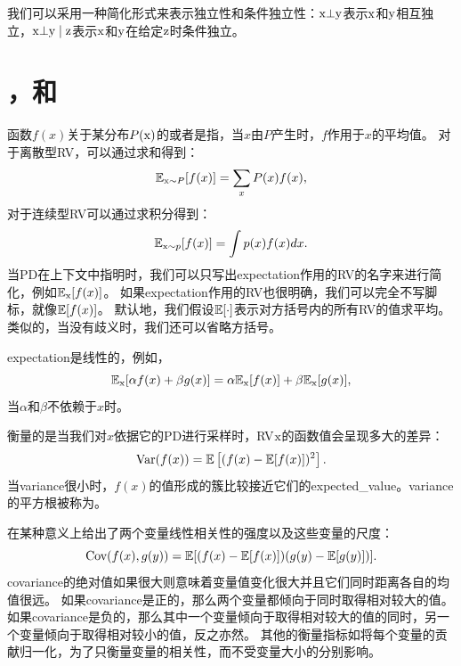 我们可以采用一种简化形式来表示独立性和条件独立性：$\mathrm{x} \bot \mathrm{y}$表示$\mathrm{x}$和$\mathrm{y}$相互独立，$\mathrm{x} \bot \mathrm{y} \mid \mathrm{z}$表示$\mathrm{x}$和$\mathrm{y}$在给定$\mathrm{z}$时条件独立。

\section{，和}
\label{sec:expectation_variance_and_covariance}

函数$f(x)$关于某分布$P(\mathrm{x})$的或者是指，当$x$由$P$产生时，$f$作用于$x$的平均值。
对于离散型\gls{RV}，可以通过求和得到：
\begin{equation}
\mathbb{E}_{\mathrm{x} \sim P}[f(x)] = \sum_x P(x)f(x),
\end{equation}
对于连续型\gls{RV}可以通过求积分得到：
\begin{equation}
\mathbb{E}_{\mathrm{x} \sim p}[f(x)] = \int p(x)f(x)dx.
\end{equation}
当\gls{PD}在上下文中指明时，我们可以只写出\gls{expectation}作用的\gls{RV}的名字来进行简化，例如$\mathbb{E}_{\mathrm{x}}[f(x)]$。
如果\gls{expectation}作用的\gls{RV}也很明确，我们可以完全不写脚标，就像$\mathbb{E}[f(x)]$。
默认地，我们假设$\mathbb{E}[\cdot]$表示对方括号内的所有\gls{RV}的值求平均。
类似的，当没有歧义时，我们还可以省略方括号。


\gls{expectation}是线性的，例如，
\begin{equation}
\mathbb{E}_{\mathrm{x}}[\alpha f(x) + \beta g(x)] = \alpha \mathbb{E}_{\mathrm{x}}[f(x)] + \beta \mathbb{E}_{\mathrm{x}}[g(x)],
\end{equation}
当$\alpha$和$\beta$不依赖于$x$时。

衡量的是当我们对$x$依据它的\gls{PD}进行采样时，\gls{RV}$\mathrm{x}$的函数值会呈现多大的差异：
\begin{equation}
\text{Var}(f(x)) = \mathbb{E} \left [(f(x) - \mathbb{E}[f(x)])^2 \right].
\end{equation}
当\gls{variance}很小时，$f(x)$的值形成的簇比较接近它们的\gls{expected_value}。\gls{variance}的平方根被称为。

在某种意义上给出了两个变量线性相关性的强度以及这些变量的尺度：
\begin{equation}
\text{Cov}(f(x), g(y)) = \mathbb{E}[ ( f(x)-\mathbb{E}[f(x)] )( g(y)-\mathbb{E}[g(y)] ) ].
\end{equation}
\gls{covariance}的绝对值如果很大则意味着变量值变化很大并且它们同时距离各自的均值很远。
如果\gls{covariance}是正的，那么两个变量都倾向于同时取得相对较大的值。
如果\gls{covariance}是负的，那么其中一个变量倾向于取得相对较大的值的同时，另一个变量倾向于取得相对较小的值，反之亦然。
其他的衡量指标如将每个变量的贡献归一化，为了只衡量变量的相关性，而不受变量大小的分别影响。

